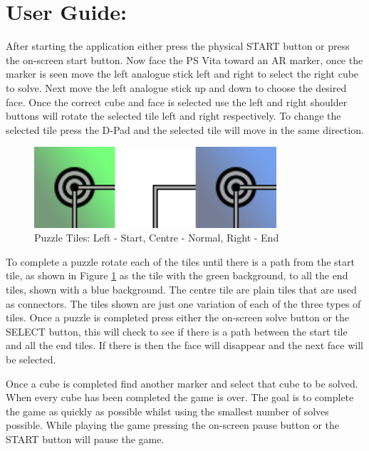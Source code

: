 \section{User Guide:}\label{sc:userguide}

After starting the application either press the physical START button or press the on-screen start button.
Now face the PS Vita toward an AR marker, once the marker is seen move the left analogue stick left and right to select the right cube to solve.
Next move the left analogue stick up and down to choose the desired face.
Once the correct cube and face is selected use the left and right shoulder buttons will rotate the selected tile left and right respectively.
To change the selected tile press the D-Pad and the selected tile will move in the same direction. 

\begin{figure}[ht!]
	\centering
	\includegraphics[width=90mm]{images/tiles.png}
	\caption{Puzzle Tiles: Left - Start, Centre - Normal, Right - End}
	\label{fig:tiles}
\end{figure}

To complete a puzzle rotate each of the tiles until there is a path from the start tile, as shown in Figure \ref{fig:tiles} as the tile with the green background, to all the end tiles, shown with a blue background.
The centre tile are plain tiles that are used as connectors.
The tiles shown are just one variation of each of the three types of tiles.
Once a puzzle is completed press either the on-screen solve button or the SELECT button, this will check to see if there is a path between the start tile and all the end tiles.
If there is then the face will disappear and the next face will be selected. 

Once a cube is completed find another marker and select that cube to be solved.
When every cube has been completed the game is over.
The goal is to complete the game as quickly as possible whilst using the smallest number of solves possible.
While playing the game pressing the on-screen pause button or the START button will pause the game.